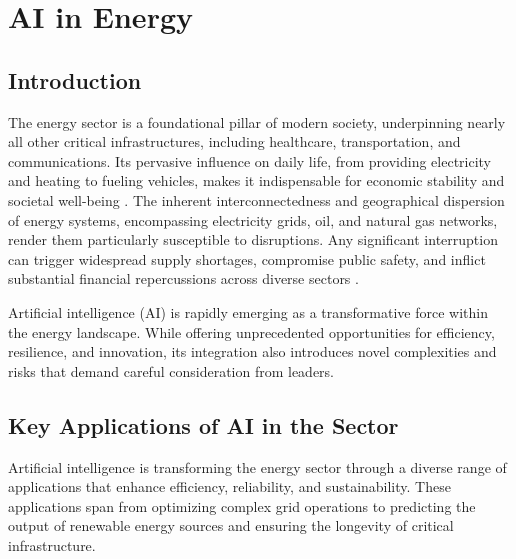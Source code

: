 \chapter{AI in Energy}
\label{cha:ai_in_energy}

\section{Introduction}

The energy sector is a foundational pillar of modern society, underpinning nearly all other critical infrastructures, including healthcare, transportation, and communications. Its pervasive influence on daily life, from providing electricity and heating to fueling vehicles, makes it indispensable for economic stability and societal well-being \cite{CISA_Energy}. The inherent interconnectedness and geographical dispersion of energy systems, encompassing electricity grids, oil, and natural gas networks, render them particularly susceptible to disruptions. Any significant interruption can trigger widespread supply shortages, compromise public safety, and inflict substantial financial repercussions across diverse sectors \cite{DomesticPreparedness_Energy}.

Artificial intelligence (AI) is rapidly emerging as a transformative force within the energy landscape. While offering unprecedented opportunities for efficiency, resilience, and innovation, its integration also introduces novel complexities and risks that demand careful consideration from leaders.

\section{Key Applications of AI in the Sector}

Artificial intelligence is transforming the energy sector through a diverse range of applications that enhance efficiency, reliability, and sustainability. These applications span from optimizing complex grid operations to predicting the output of renewable energy sources and ensuring the longevity of critical infrastructure.

